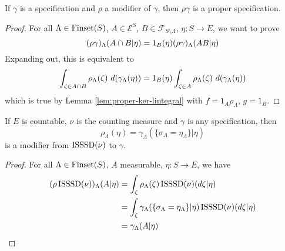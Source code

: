 
\begin{lemma}
    \label{lem:modif-proper}
    \leanok{}

    If $\gamma$ is a specification and $\rho$ a modifier of $\gamma$, then $\rho\gamma$ is a proper specification.
\end{lemma}
\begin{proof}
    \leanok

    For all $\Lambda \in \operatorname{Finset}(S)$, $A \in \mathcal E^S$, $B \in \mathcal{F}_{S\setminus\Lambda}$, $\eta : S \to E$, we want to prove
    $$(\rho\gamma)_\Lambda(A \cap B | \eta) = 1_B(\eta) (\rho\gamma)_\Lambda(A B | \eta)$$
    Expanding out, this is equivalent to
    $$\int_{\zeta \in A \inter B} \rho_\Lambda(\zeta)\ d(\gamma_\Lambda(\eta)) = 1_B(\eta) \int_{\zeta \in A} \rho_\Lambda(\zeta)\ d(\gamma_\Lambda(\eta))$$
    which is true by Lemma \ref{lem:proper-ker-lintegral} with $f = 1_A\rho_\Lambda$, $g = 1_B$.
\end{proof}





\begin{lemma}
    \label{lem:exists-modif-isssd}

    If $E$ is countable, $\nu$ is the counting measure and $\gamma$ is any specification, then
    $$\rho_\Lambda(\eta) = \gamma_\Lambda(\{\sigma_\Lambda = \eta_\Lambda\} | \eta)$$
    is a modifier from $\operatorname{ISSSD}(\nu)$ to $\gamma$.
\end{lemma}
\begin{proof}

    For all $\Lambda \in \operatorname{Finset}(S)$, $A$ measurable, $\eta : S \to E$, we have
    \begin{align}
        (\rho\operatorname{ISSSD}(\nu))_\Lambda(A|\eta)
        & = \int_\zeta \rho_\Lambda(\zeta) \operatorname{ISSSD}(\nu)(d\zeta|\eta) \\
        & = \int_\zeta \gamma_\Lambda(\{\sigma_\Lambda = \eta_\Lambda\} | \eta) \operatorname{ISSSD}(\nu)(d\zeta|\eta) \\
        & = \gamma_\Lambda(A|\eta)
    \end{align}
\end{proof}

